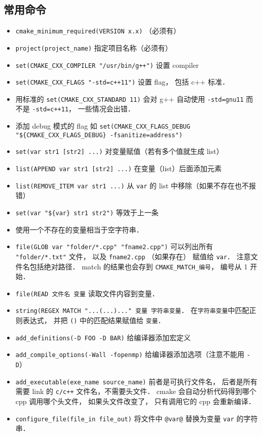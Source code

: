 \subsection{常用命令}
\begin{itemize}
\item \verb`cmake_minimum_required(VERSION x.x)` （必须有）
\item \verb`project(project_name)` 指定项目名称（必须有）
\item \verb|set(CMAKE_CXX_COMPILER "/usr/bin/g++")| 设置 compiler
\item \verb|set(CMAKE_CXX_FLAGS "-std=c++11")| 设置 flag， 包括 c++ 标准．
\item 用标准的 \verb|set(CMAKE_CXX_STANDARD 11)| 会对 g++ 自动使用 \verb|-std=gnu11| 而不是 \verb|-std=c++11|， 一些情况会出错．
\item 添加 debug 模式的 flag 如 \verb|set(CMAKE_CXX_FLAGS_DEBUG "${CMAKE_CXX_FLAGS_DEBUG} -fsanitize=address")|
\item \verb`set(var str1 [str2] ...)` 对变量赋值（若有多个值就生成 list）
\item \verb`list(APPEND var str1 [str2] ...)` 在变量（list）后面添加元素
\item \verb|list(REMOVE_ITEM var str1 ...)| 从 \verb|var| 的 list 中移除（如果不存在也不报错）
\item \verb|set(var "${var} str1 str2")| 等效于上一条
\item 使用一个不存在的变量相当于空字符串．
\item \verb`file(GLOB var "folder/*.cpp" "fname2.cpp")` 可以列出所有 \verb|"folder/*.txt"| 文件， 以及 \verb|fname2.cpp| （如果存在） 赋值给 \verb|var|． 注意文件名包括绝对路径． match 的结果也会存到 \verb|CMAKE_MATCH_编号|， 编号从 1 开始．
\item \verb|file(READ 文件名 变量| 读取文件内容到变量．
\item \verb|string(REGEX MATCH "...(...)..." 变量 字符串变量|． 在\verb|字符串变量|中匹配正则表达式， 并把 \verb|()| 中的匹配结果赋值给 \verb|变量|．
\item \verb|add_definitions(-D FOO -D BAR)| 给编译器添加宏定义
\item \verb|add_compile_options(-Wall -fopenmp)| 给编译器添加选项（注意不能用 \verb|-D|）
\item \verb`add_executable(exe_name source_name)` 前者是可执行文件名， 后者是所有需要 link 的 \verb|c/c++| 文件名，不需要头文件． cmake 会自动分析代码得到哪个 cpp 调用哪个头文件， 如果头文件改变了， 只有调用它的 cpp 会重新编译．
\item \verb`configure_file(file_in file_out)` 将文件中 \verb`@var@` 替换为变量 \verb`var` 的字符串．

\end{itemize}
